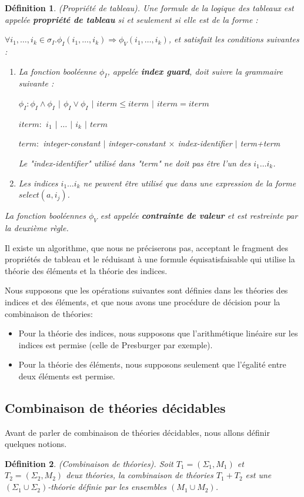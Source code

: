 \documentclass[11pt,openany]{article}
\newtheorem{definition}{D\'efinition}[subsection]
\begin{document}
	\begin{definition}
		(Propri\'et\'e de tableau). Une formule de la logique des tableaux est appel\'ee \textbf{propri\'et\'e de tableau} si et seulement si elle est de la forme :
		
$\forall i_{1},\ldots,i_{k}\in \sigma_I.\phi_{I}(i_{1},\ldots,i_{k})\Longrightarrow\phi_{V}(i_{1},\ldots,i_{k})$, et satisfait les conditions suivantes :
\begin{enumerate}
\item La fonction bool\'eenne $\phi_I$, appel\'ee \textbf{index guard}, doit suivre la grammaire suivante :

$\phi_I : \phi_I\land \phi_I$ $|$ $\phi_I\lor \phi_I$ $|$ $iterm\leq iterm$ $|$ $iterm = iterm$

$iterm :$ $i_{1}$ $|$ $\ldots$ $|$ $i_{k}$ $|$ $term$

$term :$ integer-constant $|$ integer-constant $\times$ index-identifier $|$ term+term

Le "index-identifier" utilis\'e dans "term" ne doit pas \^etre l'un des $i_{1}\ldots i_{k}$.
\item Les indices $i_{1}\ldots i_{k}$ ne peuvent \^etre utilis\'e que dans une expression de la forme $select(a,i_{j})$.
\end{enumerate}

La fonction bool\'eennes $\phi_{V}$ est appel\'ee \textbf{contrainte de valeur} et est restreinte par la deuxi\`eme r\`egle.
	\end{definition}
	Il existe un algorithme, que nous ne pr\'eciserons pas, acceptant le fragment des propri\'et\'es de tableau et le r\'eduisant \`a une formule \'equisatisfaisable qui utilise la th\'eorie des \'el\'ements et la th\'eorie des indices.
	
	Nous supposons que les op\'erations suivantes sont d\'efinies dans les th\'eories des indices et des \'el\'ements, et que nous avons une proc\'edure de d\'ecision pour la combinaison de th\'eories: 
	\begin{itemize}
	\item Pour la th\'eorie des indices, nous supposons que l'arithm\'etique lin\'eaire sur les indices est permise (celle de Presburger par exemple).
	\item Pour la th\'eorie des \'el\'ements, nous supposons seulement que l'\'egalit\'e entre deux \'el\'ements est permise.
	\end{itemize}

	
 	\subsection{Combinaison de th\'eories d\'ecidables}
 	Avant de parler de combinaison de th\'eories d\'ecidables, nous allons d\'efinir quelques notions.
 	\begin{definition}
 	(Combinaison de th\'eories).
 		Soit $T_{1}=(\Sigma_{1},M_{1})$ et $T_{2}=(\Sigma_{2},M_{2})$ deux th\'eories, la combinaison de th\'eories $T_{1} + T_{2}$ est une $(\Sigma_{1}\cup\Sigma_{2})$-th\'eorie d\'efinie par les ensembles $(M_{1}\cup M_{2})$.
	\end{definition}
	
\end{document}
